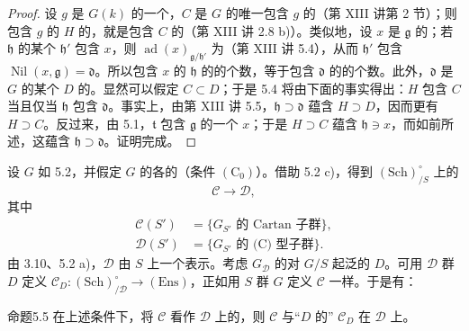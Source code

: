 \begin{proof}
设 $g$ 是 $G(k)$ 的一个，$C$ 是 $G$ 的唯一包含 $g$ 的（第 XIII 讲第 2 节）；则包含 $g$ 的 $H$ 的，就是包含 $C$ 的（第 XIII 讲 2.8 b)）。类似地，设 $x$ 是 $\mathfrak g$ 的；若 $\mathfrak h$ 的某个 $\mathfrak h'$ 包含 $x$，则 $\operatorname{ad}(x)_{\mathfrak g/\mathfrak h'}$ 为（第 XIII 讲 5.4），从而 $\mathfrak h'$ 包含 $\operatorname{Nil}(x,\mathfrak g)=\mathfrak d$。所以包含 $x$ 的 $\mathfrak h$ 的的个数，等于包含 $\mathfrak d$ 的的个数。此外，$\mathfrak d$ 是 $G$ 的某个 $D$ 的。显然可以假定 $C\subset D$；于是 5.4 将由下面的事实得出：$H$ 包含 $C$ 当且仅当 $\mathfrak h$ 包含 $\mathfrak d$。事实上，由第 XIII 讲 5.5，$\mathfrak h\supset\mathfrak d$ 蕴含 $H\supset D$，因而更有 $H\supset C$。反过来，由 5.1，$\mathfrak t$ 包含 $\mathfrak g$ 的一个 $x$；于是 $H\supset C$ 蕴含 $\mathfrak h\ni x$，而如前所述，这蕴含 $\mathfrak h\supset\mathfrak d$。证明完成。
\end{proof}
设 $G$ 如 5.2，并假定 $G$ 的各的（条件 $(\mathrm C_0)$）。借助 5.2 c)，得到 $(\mathrm{Sch})_{/S}^{\circ}$ 上的
\[\mathcal C\longrightarrow\mathcal D,\]
其中
\[\begin{aligned}
\mathcal C(S')&=\{G_{S'}\text{ 的 Cartan 子群}\},\\
\mathcal D(S')&=\{G_{S'}\text{ 的 (C) 型子群}\}.
\end{aligned}\]
由 3.10、5.2 a)，$\mathcal D$ 由 $S$ 上一个表示。考虑 $G_{\mathcal D}$ 的对 $G/S$ 起泛的 $D$。可用 $\mathcal D$ 群 $D$ 定义 $\mathcal C_D:(\mathrm{Sch})_{/\mathcal D}^{\circ}\to(\mathrm{Ens})$，正如用 $S$ 群 $G$ 定义 $\mathcal C$ 一样。于是有：
\begin{SGAresult}{命题}{5.5}
在上述条件下，将 $\mathcal C$ 看作 $\mathcal D$ 上的，则 $\mathcal C$ 与“$D$ 的” $\mathcal C_D$ 在 $\mathcal D$ 上。
\end{SGAresult}
